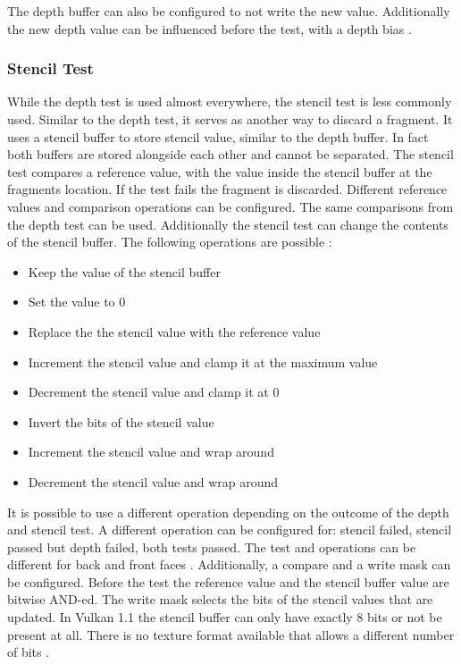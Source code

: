 The depth buffer can also be configured to not write the new value. Additionally the new depth value can be influenced before the test, with a depth bias \cite{sellers:vulkanprogramming}.

\subsubsection{Stencil Test}
\label{section:stenciltest}

While the depth test is used almost everywhere, the stencil test is less commonly used. Similar to the depth test, it serves as another way to discard a fragment. It uses a stencil buffer to store stencil value, similar to the depth buffer. In fact both buffers are stored alongside each other and cannot be separated. The stencil test compares a reference value, with the value inside the stencil buffer at the fragments location. If the test fails the fragment is discarded. Different reference values and comparison operations can be configured. The same comparisons from the depth test can be used. Additionally the stencil test can change the contents of the stencil buffer. The following operations are possible \cite{sellers:vulkanprogramming}:
\begin{itemize}
	\item Keep the value of the stencil buffer
	\item Set the value to 0
	\item Replace the the stencil value with the reference value
	\item Increment the stencil value and clamp it at the maximum value
	\item Decrement the stencil value and clamp it at 0
	\item Invert the bits of the stencil value
	\item Increment the stencil value and wrap around
	\item Decrement the stencil value and wrap around	
\end{itemize}

It is possible to use a different operation depending on the outcome of the depth and stencil test. A different operation can be configured for: stencil failed, stencil passed but depth failed, both tests passed. The test and operations can be different for back and front faces \cite{sellers:vulkanprogramming}. Additionally, a compare and a write mask can be configured. Before the test the reference value and the stencil buffer value are bitwise AND-ed. The write mask selects the bits of the stencil values that are updated. In Vulkan 1.1 the stencil buffer can only have exactly 8 bits or not be present at all. There is no texture format available that allows a different number of bits \cite{khronos:vulkan:spec1.1}.

